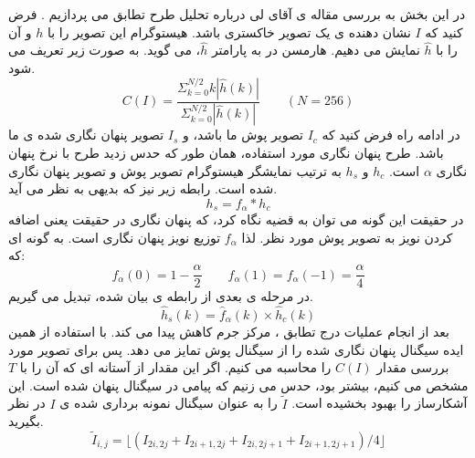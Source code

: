 در این بخش به بررسی مقاله ی آقای لی{} درباره تحلیل طرح تطابق {} می پردازیم \cite{Li2008_Detecting}. فرض کنید که $ I $ نشان دهنده ی یک تصویر خاکستری باشد. هیستوگرام این تصویر را با $ h $ و {} آن را با   $ \hat{h} $ نمایش می دهیم. هارمسن{} در \cite{Harmsen2003_Steganalysis} به پارامتر $ \hat{h} $، {} {} می گوید. {} {} به صورت زیر تعریف می شود.
\begin{equation}
C(I)=\frac{\Sigma _{k=0}^{N/2}k|\hat{h}(k)|}{\Sigma _{k=0}^{N/2}|\hat{h}(k) | }\qquad (N=256)
\end{equation}
در ادامه راه فرض کنید که $ I_{c} $ تصویر پوش ما باشد، و $ I_{s} $ تصویر پنهان نگاری شده ی ما باشد. طرح پنهان نگاری مورد استفاده، همان طور که حدس زدید طرح  {} با نرخ پنهان نگاری $ \alpha $  است. $ h_{c} $ و $ h_{s} $ به ترتیب نمایشگر هیستوگرام تصویر پوش و تصویر پنهان نگاری شده است. رابطه زیر نیز که بدیهی به نظر می آید.
\begin{equation}
h_{s}=f_{\alpha }*h_{c}
\end{equation}
در حقیقت این گونه می توان به قضیه نگاه کرد، که پنهان نگاری در حقیقت یعنی اضافه کردن نویز به تصویر پوش مورد نظر. لذا $ f_{\alpha } $ توزیع نویز پنهان نگاری است. به گونه ای که:
\begin{equation}
f_{\alpha }(0)=1-\frac{\alpha }{2}\qquad f_{\alpha }(1)=f_{\alpha }(-1)=\frac{\alpha }{4}
\end{equation}
در مرحله ی بعدی از رابطه ی بیان شده، تبدیل {} می گیریم.
\begin{equation}
\label{DFTHist}
\hat{h}_{s}(k)=\hat{f}_{\alpha }(k)\times \hat{h}_{c}(k)
\end{equation}
بعد  از انجام عملیات درج تطابق {}، مرکز جرم {} کاهش پیدا می کند. \cite{Harmsen2003_Steganalysis} با استفاده از همین ایده سیگنال پنهان نگاری شده را از سیگنال پوش تمایز می دهد. پس برای تصویر مورد بررسی مقدار $ C(I) $ را محاسبه می کنیم. اگر این مقدار از آستانه ای که آن را با $ T $ مشخص می کنیم، بیشتر بود، حدس می زنیم که پیامی در سیگنال پنهان شده است. \cite{Ker2005_Steganalysis} این آشکارساز را بهبود بخشیده است. $ \tilde{I} $ را به عنوان سیگنال نمونه برداری شده ی $ I $ در نظر بگیرید. 
\begin{equation}
\tilde{I}_{i,j}=\lfloor (I_{2i,2j}+I_{2i+1,2j}+I_{2i,2j+1}+I_{2i+1,2j+1})/4 \rfloor
\end{equation}


